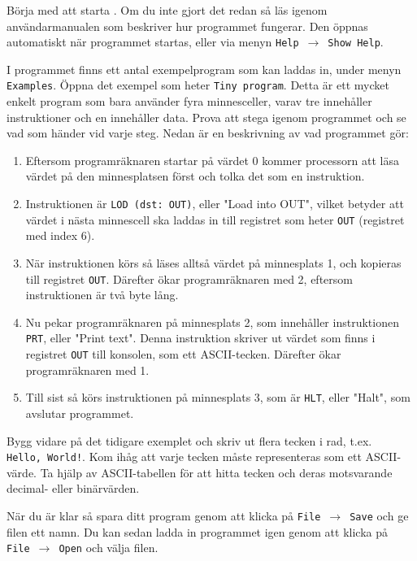 \begin{Datorarbete}
    \item {} Börja med att starta \progname{}. Om du inte gjort det redan så läs igenom användarmanualen som beskriver hur programmet fungerar. Den öppnas automatiskt när programmet startas, eller via menyn \texttt{Help}~$\rightarrow$~\texttt{Show Help}.

    \item {} I programmet finns ett antal exempelprogram som kan laddas in, under menyn \texttt{Examples}. Öppna det exempel som heter \texttt{Tiny program}. Detta är ett mycket enkelt program som bara använder fyra minnesceller, varav tre innehåller instruktioner och en innehåller data. Prova att stega igenom programmet och se vad som händer vid varje steg. Nedan är en beskrivning av vad programmet gör:
    \begin{enumerate}
        \item Eftersom programräknaren startar på värdet 0 kommer processorn att läsa värdet på den minnesplatsen först och tolka det som en instruktion.
        \item Instruktionen är \texttt{LOD (dst: OUT)}, eller "Load into OUT", vilket betyder att värdet i nästa minnescell ska laddas in till registret som heter \texttt{OUT} (registret med index 6).
        \item När instruktionen körs så läses alltså värdet på minnesplats 1, och kopieras till registret \texttt{OUT}. Därefter ökar programräknaren med 2, eftersom instruktionen är två byte lång.
        \item Nu pekar programräknaren på minnesplats 2, som innehåller instruktionen \texttt{PRT}, eller "Print text". Denna instruktion skriver ut värdet som finns i registret \texttt{OUT} till konsolen, som ett ASCII-tecken. Därefter ökar programräknaren med 1.
        \item Till sist så körs instruktionen på minnesplats 3, som är \texttt{HLT}, eller "Halt", som avslutar programmet.
    \end{enumerate}

    \item {} Bygg vidare på det tidigare exemplet och skriv ut flera tecken i rad, t.ex. \texttt{Hello,~World!}. Kom ihåg att varje tecken måste representeras som ett ASCII-värde. Ta hjälp av ASCII-tabellen för att hitta tecken och deras motsvarande decimal- eller binärvärden.

    \noindent När du är klar så spara ditt program genom att klicka på \texttt{File}~$\rightarrow$~\texttt{Save} och ge filen ett namn. Du kan sedan ladda in programmet igen genom att klicka på \texttt{File}~$\rightarrow$~\texttt{Open} och välja filen.
    \vspace{-2mm}


\end{Datorarbete}

